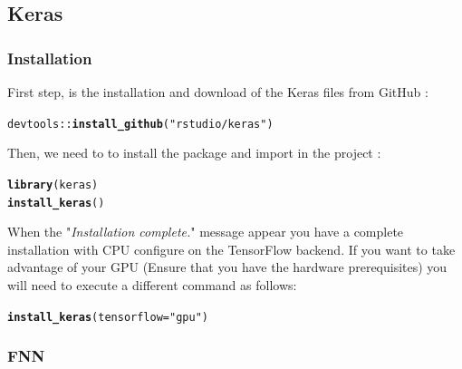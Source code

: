 \documentclass[letter]{article}\usepackage[]{graphicx}\usepackage[]{color}
\makeatletter
\newcommand{\hlstr}[1]{\textcolor[rgb]{0.192,0.494,0.8}{#1}}%
\newcommand{\hlopt}[1]{\textcolor[rgb]{0,0,0}{#1}}%
\newcommand{\hlstd}[1]{\textcolor[rgb]{0.345,0.345,0.345}{#1}}%
\newcommand{\hlkwc}[1]{\textcolor[rgb]{0.333,0.667,0.333}{#1}}%
\newcommand{\hlkwd}[1]{\textcolor[rgb]{0.737,0.353,0.396}{\textbf{#1}}}%
\newenvironment{kframe}{%
 \def\at@end@of@kframe{}%
 \ifinner\ifhmode%
  \def\at@end@of@kframe{\end{minipage}}%
  \begin{minipage}{\columnwidth}%
 \fi\fi%
 \def\FrameCommand##1{\hskip\@totalleftmargin \hskip-\fboxsep
 \colorbox{shadecolor}{##1}\hskip-\fboxsep
     \hskip-\linewidth \hskip-\@totalleftmargin \hskip\columnwidth}%
 \MakeFramed {\advance\hsize-\width
   \@totalleftmargin\z@ \linewidth\hsize
   \@setminipage}}%
 {\par\unskip\endMakeFramed%
 \at@end@of@kframe}
\newenvironment{knitrout}{}{} %
\makeatother
\begin{document}
\subsection{Keras}
\subsubsection{Installation}
First step, is the installation and download of the Keras files from GitHub :
\begin{knitrout}
\color{fgcolor}\begin{kframe}
\begin{alltt}
\hlstd{devtools}\hlopt{::}\hlkwd{install_github}\hlstd{(}\hlstr{"rstudio/keras"}\hlstd{)}
\end{alltt}
\end{kframe}
\end{knitrout}
Then, we need to to install the package and import in the project :
\begin{knitrout}
\color{fgcolor}\begin{kframe}
\begin{alltt}
\hlkwd{library}\hlstd{(keras)}
\hlkwd{install_keras}\hlstd{()}
\end{alltt}
\end{kframe}
\end{knitrout}
When the "\textit{Installation complete.}" message appear you have a complete installation with CPU configure on the TensorFlow backend.
If you want to take advantage of your GPU (Ensure that you have the hardware prerequisites) you will need to execute a different command as follows:
\begin{knitrout}
\color{fgcolor}\begin{kframe}
\begin{alltt}
\hlkwd{install_keras}\hlstd{(}\hlkwc{tensorflow} \hlstd{=} \hlstr{"gpu"}\hlstd{)}
\end{alltt}
\end{kframe}
\end{knitrout}
\subsubsection{FNN}
\end{document}
